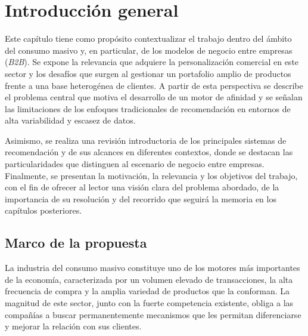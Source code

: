 
\chapter{Introducción general} %

\label{Chapter1} %
\label{IntroGeneral}

Este capítulo tiene como propósito contextualizar el trabajo dentro del ámbito del consumo masivo y, en particular, de los modelos de negocio entre empresas (\textit{B2B}). Se expone la relevancia que adquiere la personalización comercial en este sector y los desafíos que surgen al gestionar un portafolio amplio de productos frente a una base heterogénea de clientes. A partir de esta perspectiva se describe el problema central que motiva el desarrollo de un motor de afinidad y se señalan las limitaciones de los enfoques tradicionales de recomendación en entornos de alta variabilidad y escasez de datos.

Asimismo, se realiza una revisión introductoria de los principales sistemas de
recomendación y de sus alcances en diferentes contextos, donde se destacan las
particularidades que distinguen al escenario de negocio entre empresas. Finalmente, se presentan la motivación, la relevancia y los objetivos del trabajo, con el fin de ofrecer al lector una visión clara del problema abordado, de la importancia de su resolución y del recorrido que seguirá la memoria en los capítulos posteriores.


\newcommand{\keyword}[1]{\textbf{#1}}
\newcommand{\tabhead}[1]{\textbf{#1}}
\newcommand{\code}[1]{\texttt{#1}}
\newcommand{\file}[1]{\texttt{\bfseries#1}}
\newcommand{\option}[1]{\texttt{\itshape#1}}
\newcommand{\grados}{$^{\circ}$}


\section{Marco de la propuesta}

La industria del consumo masivo constituye uno de los motores más importantes de la economía, caracterizada por un volumen elevado de transacciones, la alta frecuencia de compra y la amplia variedad de productos que la conforman. La magnitud de este sector, junto con la fuerte competencia existente, obliga a las compañías a buscar permanentemente mecanismos que les permitan diferenciarse y mejorar la relación con sus clientes.

